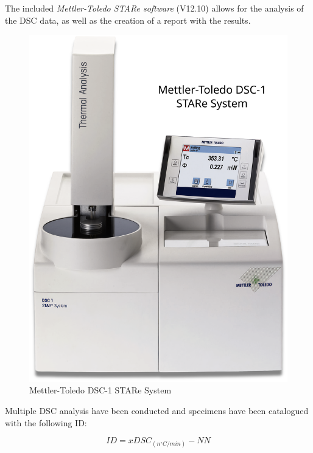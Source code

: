 \documentclass{article}
\begin{document}
                The included \textit{Mettler-Toledo STARe software} (V12.10) allows for the analysis of the 
                DSC data, as well as the creation of a report with the results. \\ 

                    \begin{figure}[h!]
                        \includegraphics[width=\textwidth]{Pictures/mettler_toledo_DSC1.eps}
                        \caption{Mettler-Toledo DSC-1 STARe System \autocites{Mettler_Toledo}}
                        \label{fig:mettler_toledo_DSC1}
                    \end{figure}

                Multiple DSC analysis have been conducted and specimens have been catalogued with the following ID: 

                \begin{equation}
                    ID = xDSC_{(n ^{\circ}C/min)}-NN
                    \label{eq:DSC_ID}
                \end{equation}
\end{document}

